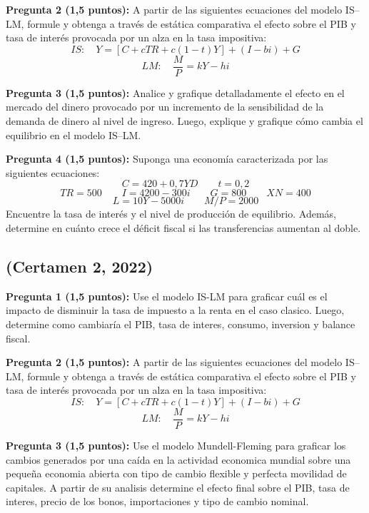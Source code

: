 \documentclass[11pt,addpoints]{article}
\begin{document}
\vspace{0.3cm}
\textbf{Pregunta 2 (1,5 puntos):}  
A partir de las siguientes ecuaciones del modelo IS–LM, formule y obtenga a través de estática comparativa el efecto sobre el PIB y tasa de interés provocada por un alza en la tasa impositiva:
\[
IS: \quad Y = [C + cTR + c(1 - t)Y] + (I - bi) + G
\]
\[
LM: \quad \frac{M}{P} = kY - hi
\]

\vspace{0.3cm}
\textbf{Pregunta 3 (1,5 puntos):}  
Analice y grafique detalladamente el efecto en el mercado del dinero provocado por un incremento de la sensibilidad de la demanda de dinero al nivel de ingreso. Luego, explique y grafique cómo cambia el equilibrio en el modelo IS–LM.

\vspace{0.3cm}
\textbf{Pregunta 4 (1,5 puntos):}  
Suponga una economía caracterizada por las siguientes ecuaciones:
\[
C = 420 + 0{,}7YD \qquad t = 0{,}2
\]
\[
TR = 500 \qquad I = 4200 - 300i \qquad G = 800 \qquad XN = 400
\]
\[
L = 10Y - 5000i \qquad M/P = 2000
\]
Encuentre la tasa de interés y el nivel de producción de equilibrio. Además, determine en cuánto crece el déficit fiscal si las transferencias aumentan al doble.
\newpage
\vspace*{0.1cm}
\subsection*{(Certamen 2, 2022)}

\textbf{Pregunta 1 (1,5 puntos):}
Use el modelo IS-LM para graficar cuál es el impacto de disminuir la tasa de impuesto a la renta en el caso clasico. Luego, determine como cambiaría el PIB, tasa de interes, consumo, inversion y balance fiscal.

\vspace{0.3cm}
\textbf{Pregunta 2 (1,5 puntos):}  
A partir de las siguientes ecuaciones del modelo IS–LM, formule y obtenga a través de estática comparativa el efecto sobre el PIB y tasa de interés provocada por un alza en la tasa impositiva:
\[
IS: \quad Y = [C + cTR + c(1 - t)Y] + (I - bi) + G
\]
\[
LM: \quad \frac{M}{P} = kY - hi
\]


\vspace{0.3cm}
\textbf{Pregunta 3 (1,5 puntos):}  
Use el modelo Mundell-Fleming para graficar los cambios generados por una caída en la actividad economica mundial sobre una pequeña economia abierta con tipo de cambio flexible y perfecta movilidad de capitales. A partir de su analisis determine el efecto final sobre el PIB, tasa de interes, precio de los bonos, importaciones y tipo de cambio nominal.
\end{document}

